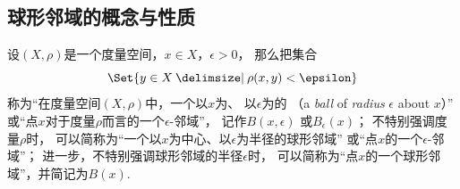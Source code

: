 \subsection{球形邻域的概念与性质}
\begin{definition}\label{definition:度量空间.球形邻域的概念}
设\((X,\rho)\)是一个度量空间，\(x \in X\)，\(\epsilon > 0\)，
那么把集合\begin{equation*}
	\Set{ y \in X \given \rho(x,y) < \epsilon }
\end{equation*}
称为“在度量空间\((X,\rho)\)中，一个以\(x\)为、
以\(\epsilon\)为的%
（a \emph{ball} of \emph{radius} \(\epsilon\) about \(x\)）”
或“点\(x\)对于度量\(\rho\)而言的一个\(\epsilon\)-邻域”，
记作\(B(x,\epsilon)\)
或\(B_{\epsilon}(x)\)；
不特别强调度量\(\rho\)时，
可以简称为“一个以\(x\)为中心、以\(\epsilon\)为半径的球形邻域”
或“点\(x\)的一个\(\epsilon\)-邻域”；
进一步，不特别强调球形邻域的半径\(\epsilon\)时，
可以简称为“点\(x\)的一个球形邻域”，并简记为\(B(x)\).
\end{definition}

